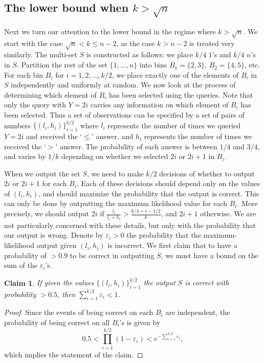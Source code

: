 \documentclass[12pt]{article}
\newtheorem{claim}[theorem]{Claim}
\newcommand{\ve}{\varepsilon}
\begin{document}
\subsection{The lower bound when $k>\sqrt{n}$}


Next we turn our attention to the lower bound in the regime where $k>\sqrt{n}$. We start with the case $\sqrt{n}<k\le n - 2$, as the case $k>n - 2$ is treated very similarly. 
The multi-set $S$ is constructed as follows: we place $k/4$ $1$'s and $k/4$ $n$'s in $S$. Partition the rest of the set $\{1,\ldots,n\}$ into bins $B_1=\{2,3\}$, $B_2=\{4,5\}$, etc. 
For each bin $B_i$ for $i=1,2,\ldots,k/2$, we place exactly one of the elements of $B_i$ in $S$ independently and uniformly at random. We now look at the process of determining which element of $B_i$ has
been selected using the queries. Note that only the query with $Y=2i$ carries any information on which element of $B_i$ has been selected. Thus a set of observations
can be specified by a set of pairs of numbers $\{(l_i,h_i)\}_{i=1}^{k/2}$ where $l_i$ represents the number of times we queried $Y=2i$ and received the `$\le$' answer, 
and $h_i$ represents the number of times we received the `$>$' answer. The probability of each answer is between $1/4$ and $3/4$, and varies by $1/k$ depending on 
whether we selected $2i$ or $2i+1$ in $B_i$. 

When we output the set $S$, we need to make $k/2$ decisions of whether to output $2i$ or $2i+1$ for each $B_i$. Each of these decisions should depend only on the 
values of $(l_i,h_i)$, and should maximize the probability that the output is correct. This can only be done by outputting the maximum likelihood value for each $B_i$. 
More precisely, we should output $2i$ if $\frac{l_i}{l_i+h_i} > \frac{k/4+i-1/2}{k}$, and $2i+1$ otherwise. We are not particularly concerned with these details, but 
only with the probability that our output is wrong. Denote by $\ve_i>0$ the probability that the maximum-likelihood output given $(l_i,h_i)$ is incorrect. 
We first claim that to have a probability of $>0.9$ to be correct in outputting $S$, we must have a bound on the sum of the $\ve_i$'s. 

\begin{claim} \label{cl:1}
If given the values  $\{(l_i,h_i)\}_{i=1}^{k/2}$ the output $S$ is correct with probability $>0.5$, then 
$\sum_{i=1}^{k/2} \ve_i< 1$.
\end{claim}

\begin{proof}
Since the events of being correct on each $B_i$ are independent, the probability of being correct on all $B_i$'s is given by
$$
0.5<\prod_{i=1}^{k/2} (1-\ve_i) < e^{-\sum_{i=1}^{k/2} \ve_i}, 
$$
which implies the statement of the claim. 
\end{proof}
\end{document}

